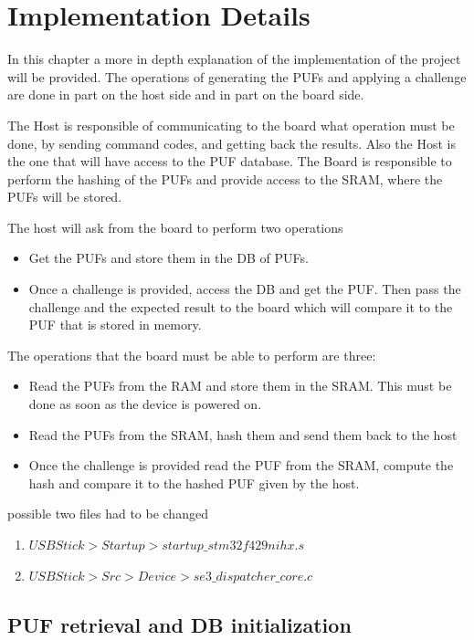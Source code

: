 \chapter{Implementation Details}
In this chapter a more in depth explanation of the implementation of the project will be provided. The operations of generating the PUFs and applying a challenge are done in part on the host side and in part on the board side.

The Host is responsible of communicating to the board what operation must be done, by sending command codes, and getting back the results. Also the Host is the one that will have access to the PUF database.
The Board is responsible to perform the hashing of the PUFs and provide access to the SRAM, where the PUFs will be stored.

The host will ask from the board to perform two operations
\begin{itemize}
	\item Get the PUFs and store them in the DB of PUFs.
	\item Once a challenge is provided, access the DB and get the PUF. Then pass the challenge and the expected result to the board which will compare it to the PUF that is stored in memory.
\end{itemize}

The operations that the board must be able to perform are three:
\begin{itemize}
	\item Read the PUFs from the RAM and store them in the SRAM. This must be done as soon as the device is powered on.
	\item Read the PUFs from the SRAM, hash them and send them back to the host
	\item Once the challenge is provided read the PUF from the SRAM, compute the hash and compare it to the hashed PUF given by the host.
\end{itemize}

 possible two files had to be changed
\begin{enumerate}
	\item $USBStick > Startup > startup\_stm32f429nihx.s$
	\item $USBStick > Src > Device > se3\_dispatcher\_core.c$
\end{enumerate}

\section {PUF retrieval and DB initialization}

